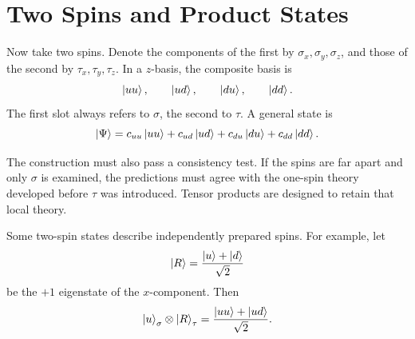 \section{Two Spins and Product States}

Now take two spins. Denote the components of the first by \(\sigma_x,\sigma_y,\sigma_z\), and those of the second by \(\tau_x,\tau_y,\tau_z\). In a \(z\)-basis, the composite basis is
\begin{equation}
\left\lvert uu\right\rangle,\qquad \left\lvert ud\right\rangle,\qquad \left\lvert du\right\rangle,\qquad \left\lvert dd\right\rangle.
\label{eq:l6-two-spin-basis}
\end{equation}
The first slot always refers to \(\sigma\), the second to \(\tau\). A general state is
\begin{equation}
\left\lvert\Psi\right\rangle
=c_{uu}\left\lvert uu\right\rangle+c_{ud}\left\lvert ud\right\rangle
+c_{du}\left\lvert du\right\rangle+c_{dd}\left\lvert dd\right\rangle.
\label{eq:l6-general-two-spin}
\end{equation}

\begin{classroomqa}
\end{classroomqa}

The construction must also pass a consistency test. If the spins are far apart and only \(\sigma\) is examined, the predictions must agree with the one-spin theory developed before \(\tau\) was introduced. Tensor products are designed to retain that local theory.

Some two-spin states describe independently prepared spins. For example, let
\begin{equation}
\left\lvert R\right\rangle=\frac{\left\lvert u\right\rangle+\left\lvert d\right\rangle}{\sqrt2}
\end{equation}
be the \(+1\) eigenstate of the \(x\)-component. Then
\begin{equation}
\left\lvert u\right\rangle_{\sigma}\otimes\left\lvert R\right\rangle_{\tau}
=\frac{\left\lvert uu\right\rangle+\left\lvert ud\right\rangle}{\sqrt2}.
\label{eq:l6-up-right-product}
\end{equation}

\begin{classroomqa}
\end{classroomqa}

